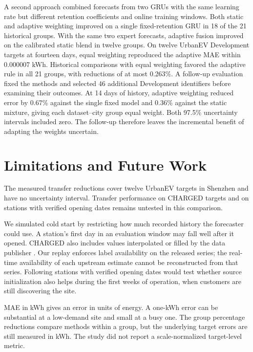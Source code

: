 A second approach combined forecasts from two GRUs with the same learning rate but different retention coefficients and online training windows. Both static and adaptive weighting improved on a single fixed-retention GRU in 18 of the 21 historical groups. With the same two expert forecasts, adaptive fusion improved on the calibrated static blend in twelve groups. On twelve UrbanEV Development targets at fourteen days, equal weighting reproduced the adaptive MAE within 0.000007 kWh. Historical comparisons with equal weighting favored the adaptive rule in all 21 groups, with reductions of at most 0.263\%. A follow-up evaluation fixed the methods and selected 46 additional Development identifiers before examining their outcomes. At 14 days of history, adaptive weighting reduced error by 0.67\% against the single fixed model and 0.36\% against the static mixture, giving each dataset--city group equal weight. Both 97.5\% uncertainty intervals included zero. The follow-up therefore leaves the incremental benefit of adapting the weights uncertain.

\section{Limitations and Future Work}

The measured transfer reductions cover twelve UrbanEV targets in Shenzhen and have no uncertainty interval. Transfer performance on CHARGED targets and on stations with verified opening dates remains untested in this comparison.

We simulated cold start by restricting how much recorded history the forecaster could use. A station's first day in an evaluation window may fall well after it opened. CHARGED also includes values interpolated or filled by the data publisher \cite{charged2025}. Our replay enforces label availability on the released series; the real-time availability of each upstream estimate cannot be reconstructed from that series. Following stations with verified opening dates would test whether source initialization also helps during the first weeks of operation, when customers are still discovering the site.

MAE in kWh gives an error in units of energy. A one-kWh error can be substantial at a low-demand site and small at a busy one. The group percentage reductions compare methods within a group, but the underlying target errors are still measured in kWh. The study did not report a scale-normalized target-level metric.

